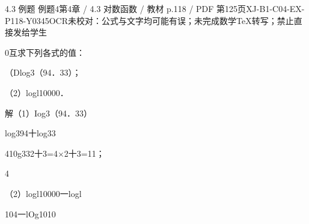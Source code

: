 \begin{bankitem}{4.3 例题 例题4}{第4章 / 4.3 对数函数 / 教材 p.118 / PDF 第125页}{XJ-B1-C04-EX-P118-Y0345}{OCR未校对：公式与文字均可能有误；未完成数学TeX转写；禁止直接发给学生}
\begin{ocrdraft}
\par
0互求下列各式的值：
\par
（Dlog3（94．33）；
\par
（2）logl10000．
\par
解（1）Iog3（94．33）
\par
log394十log33
\par
410g332十3=4\ensuremath{\times}2十3=11；
\par
4
\par
（2）logl10000一logl
\par
104一lOg1010
\end{ocrdraft}
\end{bankitem}
